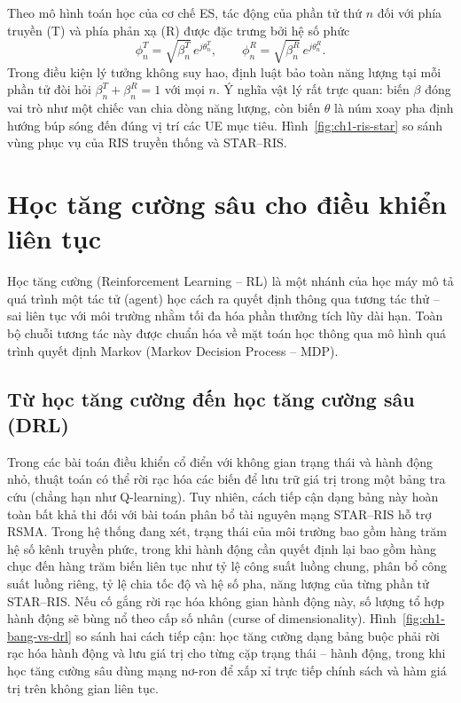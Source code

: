 Theo mô hình toán học của cơ chế ES, tác động của phần tử thứ $n$ đối với phía truyền (T) và phía phản xạ
(R) được đặc trưng bởi hệ số phức
\begin{equation}
\phi^T_n = \sqrt{\beta^T_n}\, e^{j\theta^T_n}, \qquad \phi^R_n = \sqrt{\beta^R_n}\, e^{j\theta^R_n}.
\label{eq:ch1-es}
\end{equation}
Trong điều kiện lý tưởng không suy hao, định luật bảo toàn năng lượng tại mỗi phần tử đòi hỏi
$\beta^T_n + \beta^R_n = 1$ với mọi $n$. Ý nghĩa vật lý rất trực quan: biến $\beta$ đóng vai trò như một
chiếc van chia dòng năng lượng, còn biến $\theta$ là núm xoay pha định hướng búp sóng đến đúng vị trí các
UE mục tiêu. Hình~\ref{fig:ch1-ris-star} so sánh vùng phục vụ của RIS truyền thống và STAR--RIS.



\section{Học tăng cường sâu cho điều khiển liên tục}
\label{sec:drl}

Học tăng cường (Reinforcement Learning -- RL) là một nhánh của học máy mô tả quá trình một tác tử (agent)
học cách ra quyết định thông qua tương tác thử -- sai liên tục với môi trường nhằm tối đa hóa phần thưởng
tích lũy dài hạn. Toàn bộ chuỗi tương tác này được chuẩn hóa về mặt toán học thông qua mô hình quá trình
quyết định Markov (Markov Decision Process -- MDP).

\subsection{Từ học tăng cường đến học tăng cường sâu (DRL)}
\label{ssec:rl-drl}

Trong các bài toán điều khiển cổ điển với không gian trạng thái và hành động nhỏ, thuật toán có thể rời
rạc hóa các biến để lưu trữ giá trị trong một bảng tra cứu (chẳng hạn như Q-learning). Tuy nhiên, cách
tiếp cận dạng bảng này hoàn toàn bất khả thi đối với bài toán phân bổ tài nguyên mạng STAR--RIS hỗ trợ
RSMA. Trong hệ thống đang xét, trạng thái của môi trường bao gồm hàng trăm hệ số kênh truyền phức, trong
khi hành động cần quyết định lại bao gồm hàng chục đến hàng trăm biến liên tục như tỷ lệ công suất luồng
chung, phân bổ công suất luồng riêng, tỷ lệ chia tốc độ và hệ số pha, năng lượng của từng phần tử
STAR--RIS. Nếu cố gắng rời rạc hóa không gian hành động này, số lượng tổ hợp hành động sẽ bùng nổ theo cấp
số nhân (curse of dimensionality).
Hình~\ref{fig:ch1-bang-vs-drl} so sánh hai cách tiếp cận: học tăng cường dạng bảng buộc phải rời rạc hóa
hành động và lưu giá trị cho từng cặp trạng thái -- hành động, trong khi học tăng cường sâu dùng mạng nơ-ron để
xấp xỉ trực tiếp chính sách và hàm giá trị trên không gian liên tục.

